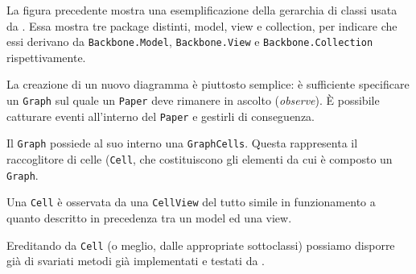 La figura precedente mostra una esemplificazione della gerarchia di classi usata da \proj. Essa mostra tre package distinti, model, view e collection, per indicare che essi derivano da \texttt{Backbone.Model}, \texttt{Backbone.View} e \texttt{Backbone.Collection} rispettivamente.

La creazione di un nuovo diagramma è piuttosto semplice: è sufficiente specificare un \texttt{Graph} sul quale un \texttt{Paper} deve rimanere in ascolto (\emph{observe}). È possibile catturare eventi all'interno del \texttt{Paper} e gestirli di conseguenza.

Il \texttt{Graph} possiede al suo interno una \texttt{GraphCells}. Questa rappresenta il raccoglitore di celle (\texttt{Cell}, che costituiscono gli elementi da cui è composto un \texttt{Graph}. 

Una \texttt{Cell} è osservata da una \texttt{CellView} del tutto simile in funzionamento a quanto descritto in precedenza tra un model ed una view. 

Ereditando da \texttt{Cell} (o meglio, dalle appropriate sottoclassi) possiamo disporre già di svariati metodi già implementati e testati da \jointjs{}.

